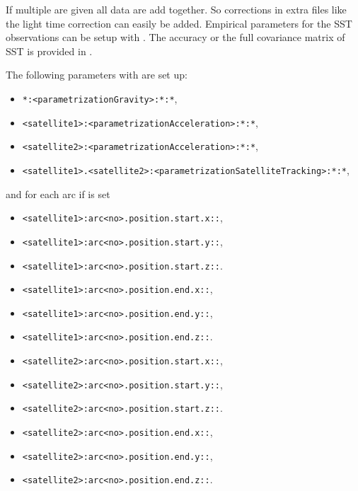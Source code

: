 If multiple  are given
all data are add together. So corrections in extra files like the light time correction
can easily be added. Empirical parameters for the SST observations can be setup with
.
The accuracy or the full covariance matrix of SST is provided in
.

The following parameters with  are set up:
\begin{itemize}
\item \verb|*:<parametrizationGravity>:*:*|,
\item \verb|<satellite1>:<parametrizationAcceleration>:*:*|,
\item \verb|<satellite2>:<parametrizationAcceleration>:*:*|,
\item \verb|<satellite1>.<satellite2>:<parametrizationSatelliteTracking>:*:*|,
\end{itemize}
and for each arc if  is set
\begin{itemize}
\item \verb|<satellite1>:arc<no>.position.start.x::|,
\item \verb|<satellite1>:arc<no>.position.start.y::|,
\item \verb|<satellite1>:arc<no>.position.start.z::|.
\item \verb|<satellite1>:arc<no>.position.end.x::|,
\item \verb|<satellite1>:arc<no>.position.end.y::|,
\item \verb|<satellite1>:arc<no>.position.end.z::|.
\item \verb|<satellite2>:arc<no>.position.start.x::|,
\item \verb|<satellite2>:arc<no>.position.start.y::|,
\item \verb|<satellite2>:arc<no>.position.start.z::|.
\item \verb|<satellite2>:arc<no>.position.end.x::|,
\item \verb|<satellite2>:arc<no>.position.end.y::|,
\item \verb|<satellite2>:arc<no>.position.end.z::|.
\end{itemize}


